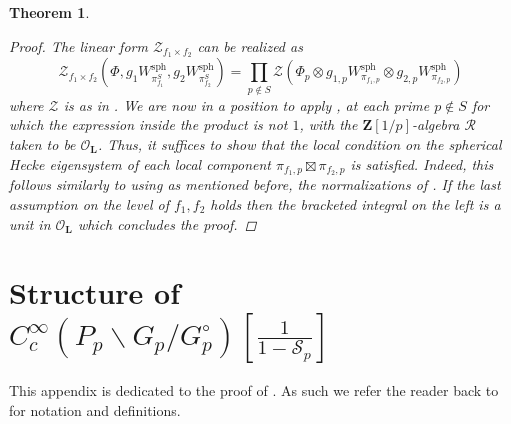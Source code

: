 \documentclass{amsart}%
\theoremstyle{plain}
\newtheorem{thm}{Theorem}[subsection]
\theoremstyle{plain}
\theoremstyle{remark}
\begin{document}
\begin{thm}
    
        \begin{proof}
        The linear form $\mathcal{Z}_{f_1\times f_2}$ can be realized as 
        $$\mathcal{Z}_{f_1\times f_2}(\Phi,g_1W_{\pi_{f_1}^S}^\mathrm{sph},g_2W_{\pi_{f_2}^S}^\mathrm{sph})=\prod_{p\not\in S}\mathcal{Z}(\Phi_p\otimes g_{1,p}W_{\pi_{f_1,p}}^\mathrm{sph}\otimes g_{2,p}W_{\pi_{f_2,p}}^\mathrm{sph})$$
        where $\mathcal{Z}$ is as in . We are now in a position to apply , at each prime $p\not\in S$ for which the expression inside the product is not $1$, with the $\mathbf{Z}[1/p]$-algebra $\mathcal{R}$ taken to be $\mathcal{O}_\mathbf{L}$. Thus, it suffices to show that the local condition on the spherical Hecke eigensystem of each local component $\pi_{f_1,p}\boxtimes \pi_{f_2,p}$ is satisfied. Indeed, this follows similarly to \cite[Theorem $8.1.1$]{groutides2024integral} using as mentioned before, the normalizations of \cite{loeffler2012computation}. If the last assumption on the level of $f_1,f_2$ holds then the bracketed integral on the left is a unit in $\mathcal{O}_\mathbf{L}$ which concludes the proof.
    \end{proof}
\end{thm}


\appendix
\section{Structure of $C_c^\infty(P_p\backslash G_p/G_p^\circ)[\tfrac{1}{1-\mathcal{S}_p}]$}\label{appendix}
This appendix is dedicated to the proof of . As such we refer the reader back to  for notation and definitions. 
\end{document}
